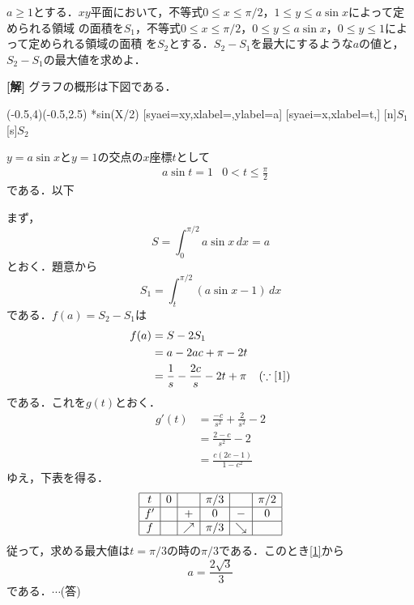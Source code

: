 \documentclass[a4j]{jarticle}
\begin{document}

\preEqlabel{$\cdots$}
     \begin{oframed}
     $a\ge 1$とする．$xy$平面において，不等式$0\le x\le\pi/2$，$1\le y\le a\sin x$によって定められる領域
     の面積を$S_1$，不等式$0\le x\le\pi/2$，$0\le y\le a\sin x$，$0\le y\le1$によって定められる領域の面積
     を$S_2$とする．$S_2-S_1$を最大にするような$a$の値と，$S_2-S_1$の最大値を求めよ．
     \end{oframed}

\setlength{\columnseprule}{0.4pt}
\begin{multicols}{2}
{\bf[解]} グラフの概形は下図である．
     
     \begin{zahyou}[ul=10mm,gentenhaiti={[se]}](-0.5,4)(-0.5,2.5)
     \def\Fx{2*sin(X/2)}
     \def\Gx{1}
     \A
     \B
     \C
     \YGurafu*\Fx
     \YGurafu*\Gx
     [syaei=xy,xlabel=,ylabel=a]{}
     [syaei=x,xlabel=t,]{}
     [n]{$S_1$}
     [s]{$S_2$}
     \end{zahyou}

$y=a\sin x$と$y=1$の交点の$x$座標$t$として
     \begin{align}
     &a\sin t=1&0<t\le\frac{\pi}{2}\label{1}
     \end{align}
である．以下\2 

まず，
     \[S=\int_0^{\pi/2}a\sin x\,dx=a\]
とおく．題意から
     \[S_1=\int_t^{\pi/2}(a\sin x-1)\,dx\]
 である．$f(a)=S_2-S_1$は
     \begin{align*}
     f(a)&=S-2S_1 \\
     &=a-2ac+\pi-2t \\
     &=\frac{1}{s}-\frac{2c}{s}-2t+\pi&(\because\eqref{1})
     \end{align*}
である．これを$g(t)$とおく．
     \begin{align*}
     g'(t)&=\frac{-c}{s^2}+\frac{2}{s^2}-2 \\
     &=\frac{2-c}{s^2}-2 \\
     &=\frac{c(2c-1)}{1-c^2}
     \end{align*}
ゆえ，下表を得る．
     \begin{align*}
          \begin{array}{|c|c|c|c|c|c|}\hline
          t  &0 &     &\pi/3&     &\pi/2 \\ \hline
          f' &   &+   &0     &-    & 0     \\ \hline
          f &    &\nearrow&\pi/3&\searrow&       \\ \hline 
          \end{array}
     \end{align*}
従って，求める最大値は$t=\pi/3$の時の$\pi/3$である．このとき\eqref{1}から
     \[a=\frac{2\sqrt{3}}{3}\]
である．$\cdots$(答)
\newpage
\end{multicols}
\end{document}
